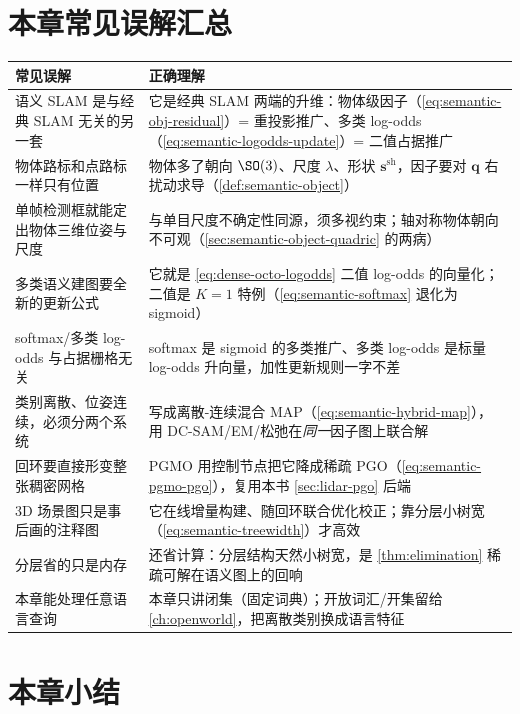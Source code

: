\section*{本章常见误解汇总}
\begin{table}[H]\centering\small
\begin{tabular}{p{} p{}}
\toprule
\textbf{常见误解} & \textbf{正确理解} \\
\midrule
语义 SLAM 是与经典 SLAM 无关的另一套 & 它是经典 SLAM 两端的升维：物体级因子（\cref{eq:semantic-obj-residual}）= 重投影推广、多类 log-odds（\cref{eq:semantic-logodds-update}）= 二值占据推广 \\
物体路标和点路标一样只有位置 & 物体多了朝向 $\SO(3)$、尺度 $\lambda$、形状 $\mathbf{s}^{\mathrm{sh}}$，因子要对 $\mathbf{q}$ 右扰动求导（\cref{def:semantic-object}）\\
单帧检测框就能定出物体三维位姿与尺度 & 与单目尺度不确定性同源，须多视约束；轴对称物体朝向不可观（\cref{sec:semantic-object-quadric} 的两病）\\
多类语义建图要全新的更新公式 & 它就是 \cref{eq:dense-octo-logodds} 二值 log-odds 的向量化；二值是 $K{=}1$ 特例（\cref{eq:semantic-softmax} 退化为 sigmoid）\\
softmax/多类 log-odds 与占据栅格无关 & softmax 是 sigmoid 的多类推广、多类 log-odds 是标量 log-odds 升向量，加性更新规则一字不差 \\
类别离散、位姿连续，必须分两个系统 & 写成离散-连续混合 MAP（\cref{eq:semantic-hybrid-map}），用 DC-SAM/EM/松弛在\emph{同一}因子图上联合解 \\
回环要直接形变整张稠密网格 & PGMO 用控制节点把它降成稀疏 PGO（\cref{eq:semantic-pgmo-pgo}），复用本书 \cref{sec:lidar-pgo} 后端 \\
3D 场景图只是事后画的注释图 & 它在线增量构建、随回环联合优化校正；靠分层小树宽（\cref{eq:semantic-treewidth}）才高效 \\
分层省的只是内存 & 还省计算：分层结构天然小树宽，是 \cref{thm:elimination} 稀疏可解在语义图上的回响 \\
本章能处理任意语言查询 & 本章只讲闭集（固定词典）；开放词汇/开集留给 \cref{ch:openworld}，把离散类别换成语言特征 \\
\bottomrule
\end{tabular}
\end{table}

\section*{本章小结}

